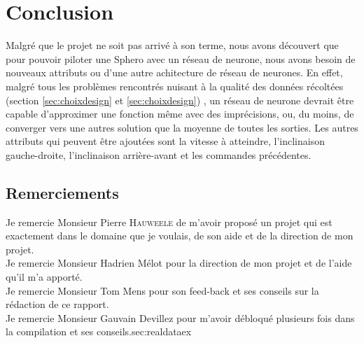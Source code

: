 \documentclass[12pt,a4paper,oneside, titlepage]{article}
\begin{document}




\section{Conclusion}
Malgré que le projet ne soit pas arrivé à son terme, nous avons découvert que pour pouvoir piloter une Sphero avec un réseau de neurone, nous avons besoin de nouveaux attributs ou d'une autre achitecture de réseau de neurones.
En effet, malgré tous les problèmes rencontrés nuisant à la qualité des données récoltées (section \ref{sec:choixdesign} et \ref{sec:choixdesign}) ,
un réseau de neurone devrait être capable d'approximer une fonction même avec des imprécisions, ou, du moins, de converger vers une autres solution que la moyenne de toutes les sorties.
Les autres attributs qui peuvent être ajoutées sont la vitesse à atteindre, l'inclinaison gauche-droite, l'inclinaison arrière-avant et les commandes précédentes.

\subsection*{Remerciements}
\noindent Je remercie Monsieur Pierre \textsc{Hauweele} de m'avoir proposé un projet qui est exactement dans le domaine que je voulais, de son aide et de la direction de mon projet.\\

\noindent Je remercie Monsieur Hadrien Mélot pour la direction de mon projet et de l'aide qu'il m'a apporté.\\

\noindent Je remercie Monsieur Tom Mens pour son feed-back et ses conseils sur la rédaction de ce rapport.\\

\noindent Je remercie Monsieur Gauvain Devillez pour m'avoir débloqué plusieurs fois dans la compilation et ses conseils.sec:realdataex


\appendix



\end{document}
